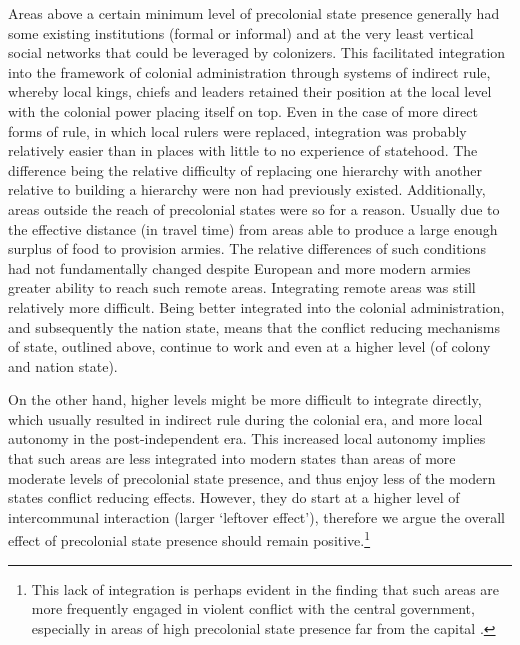 \documentclass[12pt]{article}
\begin{document}
Areas above a certain minimum level of precolonial state presence generally had
some existing institutions (formal or informal) and at the very least vertical
social networks that could be leveraged by colonizers. This facilitated
integration into the framework of colonial administration through systems of
indirect rule, whereby local kings, chiefs and leaders retained their position
at the local level with the colonial power placing itself on top. Even in the
case of more direct forms of rule, in which local rulers were replaced,
integration was probably relatively easier than in places with little to no
experience of statehood. The difference being the relative difficulty of
replacing one hierarchy with another relative to building a hierarchy were non
had previously existed. Additionally, areas outside the reach of precolonial
states were so for a reason. Usually due to the effective distance (in travel
time) from areas able to produce a large enough surplus of food to provision
armies. The relative differences of such conditions had not fundamentally
changed despite European and more modern armies greater ability to reach such
remote areas. Integrating remote areas was still relatively more difficult.
Being better integrated into the colonial administration, and subsequently the
nation state, means that the conflict reducing mechanisms of state, outlined
above, continue to work and even at a higher level (of colony and nation state).

On the other hand, higher levels might be more difficult to integrate directly,
which usually resulted in indirect rule during the colonial era, and more local
autonomy in the post-independent era. This increased local autonomy implies that
such areas are less integrated into modern states than areas of more moderate
levels of precolonial state presence, and thus enjoy less of the modern states
conflict reducing effects. However, they do start at a higher level of
intercommunal interaction (larger `leftover effect'), therefore we argue the
overall effect of precolonial state presence should remain
positive.\footnote{This lack of integration is perhaps evident in the finding
	that such areas are more frequently engaged in violent conflict with the
	central government, especially in areas of high precolonial state
presence far from the capital \citep{Wishman2021}.}

\end{document}
